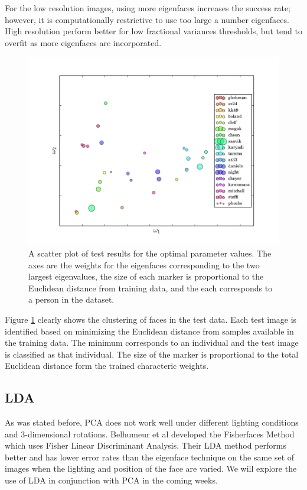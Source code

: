 \documentclass{article} %
\begin{document}
For the low resolution images, using more eigenfaces increases the success rate; however, it is computationally restrictive to use too large a number eigenfaces.  High resolution perform better for low fractional variances thresholds, but tend to overfit as more eigenfaces are incorporated.  

\begin{figure}[h]
	\centering
	\includegraphics[width=1.0\linewidth]{fig/scatter_by_name.pdf}
	\caption{A scatter plot of test results for the optimal parameter values.  The axes are the weights for the eigenfaces corresponding to the two largest eigenvalues, the size of each marker is proportional to the Euclidean distance from training data, and the each corresponds to a person in the dataset.}
	\label{fig:scatter}
\end{figure}

Figure \ref{fig:scatter} clearly shows the clustering of faces in the test data.  Each test image is identified based on minimizing the Euclidean distance from samples available in the training data.  The minimum corresponds to an individual and the test image is classified as that individual.  The size of the marker is proportional to the total Euclidean distance form the trained characteric weights.  

\subsection{LDA}

As was stated before, PCA does not work well under different lighting conditions and 3-dimensional rotations.  Belhumeur et al developed the Fisherfaces Method which uses Fisher Linear Discriminant Analysis\cite{bel97}.  Their LDA method performs better and has lower error rates than the eigenface technique on the same set of images when the lighting and position of the face are varied.  We will explore the use of LDA in conjunction with PCA in the coming weeks.
\end{document}
